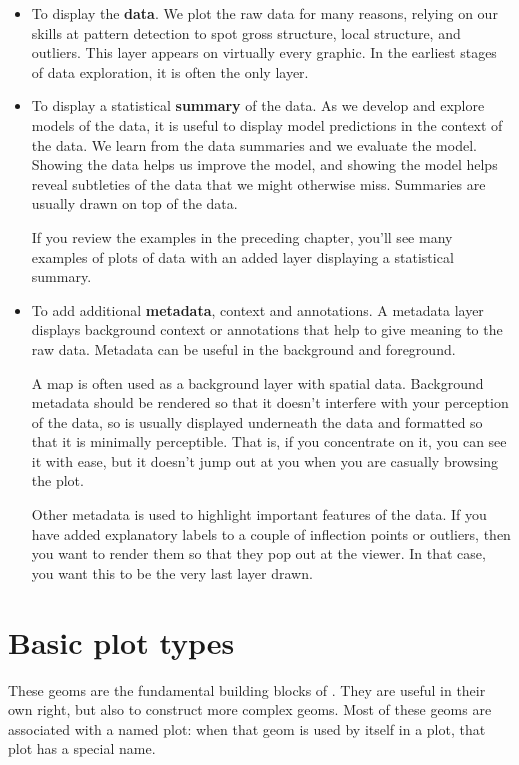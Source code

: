 \begin{itemize}
  \item To display the {\bf data}.  We plot the raw data for many reasons, relying on our skills at pattern detection to spot gross structure, local structure, and outliers.  This layer appears on virtually every graphic.  In the earliest stages of data exploration, it is often the only layer.

  \item To display a statistical {\bf summary} of the data. As we develop and explore models of the data, it is useful to display model predictions in the context of the data. We learn from the data summaries and we evaluate the model. Showing the data helps us improve the model, and showing the model helps reveal subtleties of the data that we might otherwise miss. Summaries are usually drawn on top of the data.

  If you review the examples in the preceding chapter, you'll see many examples of plots of data with an added layer displaying a statistical summary.

  \item To add additional {\bf metadata}, context and annotations. A metadata layer displays background context or annotations that help to give meaning to the raw data.  Metadata can be useful in the background and foreground.
  
  A map is often used as a background layer with spatial data. Background metadata should be rendered so that it doesn't interfere with your perception of the data, so is usually displayed underneath the data and formatted so that it is minimally perceptible. That is, if you concentrate on it, you can see it with ease, but it doesn't jump out at you when you are casually browsing the plot.

  Other metadata is used to highlight important features of the data. If you have added explanatory labels to a couple of inflection points or outliers, then you want to render them so that they pop out at the viewer. In that case, you want this to be the very last layer drawn.

\end{itemize}


\section{Basic plot types}\label{sec:basics}

These geoms are the fundamental building blocks of \ggplot.  They are useful in their own right, but also to construct more complex geoms.  Most of these geoms are associated with a named plot: when that geom is used by itself in a plot, that plot has a special name.

